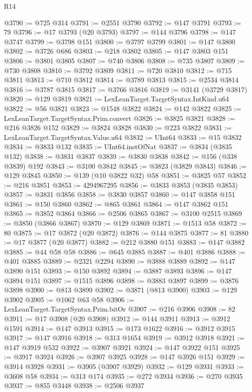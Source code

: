 \begin{lexlean}{R14}
\begin{coremodule}
@3790 := @725 @314
@3791 := @2551 @3790
@3792 := @147 @3791
@3793 := 79
@3796 := @17 @3793 (@20 @3793)
@3797 := @144 @3796
@3798 := @147 @3747
@3799 := @3798 @151
@3800 := @3797 @3799
@3801 := @147 @3800
@3802 := @3726 @686
@3803 := @218 @3802
@3805 := @147 @3803 @151
@3806 := @3801 @3805
@3807 := @740 @3806
@3808 := @735 @3807
@3809 := @730 @3808
@3810 := @3792 @3809
@3811 := @720 @3810
@3812 := @715 @3811
@3813 := @710 @3812
@3814 := @3789 @3813
@3815 := @2534 @3814
@3816 := @3787 @3815
@3817 := @3766 @3816
@3819 := @3141 (@3729 @3817)
@3820 := @129 @3819
@3821 := LexLeanTarget.TargetSyntax.IntKind.u64
@3822 := @56 @3821
@3823 := @1548 @3822
@3824 := @142 @3822
@3825 := LexLeanTarget.TargetSyntax.Prim.convert
@3826 := @3825 @3821
@3828 := @216 @3826 @152
@3829 := @3824 @3828
@3830 := @223 @3822
@3831 := LexLeanTarget.TargetSyntax.Value.u64
@3832 := UInt64
@3833 := @15 @3832
@3834 := @3833 @132
@3835 := UInt64.instOfNat
@3837 := @3834 (@3835 @132)
@3838 := @3831 @3837
@3839 := @3830 @3838
@3842 := @156 (@338 @3839) @192
@3843 := @3100 @3842
@3845 := @3823 (@3829 @3843)
@3846 := @129 @3845
@3850 := @139 (@10 @3822 @32) @58
@3851 := @3825 @57
@3852 := @216 @3851
@3853 := 4294967295
@3856 := @3833 @3853 (@3835 @3853)
@3857 := @3831 @3856
@3858 := @3830 @3857
@3860 := @147 @3858 @151
@3861 := @150 @3860
@3862 := @865 @3861
@3864 := @147 @3862 @151
@3865 := @3852 @3864
@3866 := @2506 @3865
@3867 := @3100 @2515
@3869 := @3850 (@3866 @3867)
@3870 := @129 @3869
@3871 := @1513 @58
@3872 := 80
@3875 := @17 @3872 (@20 @3872)
@3876 := @144 @3875
@3877 := 81
@3880 := @17 @3877 (@20 @3877)
@3882 := @212 @3880 @151
@3883 := @147 @3882
@3885 := @44 @58 @58
@3886 := @645 @3885
@3887 := @401 @3886
@3888 := @401 @3885
@3889 := @2321 @2294
@3890 := @3888 @3889
@3892 := @147 @3890 @151
@3893 := @150 @3892
@3894 := @3887 @3893
@3896 := @147 @3894 @151
@3897 := @1515 @3896
@3898 := @3883 @3897
@3899 := @3876 @3898
@3900 := @813 @3899
@3902 := @3871 (@813 @3900)
@3903 := @129 @3902
@3905 := @1062 @63 @58
@3906 := LexLeanTarget.TargetSyntax.Prim.bitOr
@3907 := @216 @3906
@3908 := 82
@3911 := @17 @3908 (@20 @3908)
@3912 := @144 @3911
@3913 := @3912 @1591
@3914 := @147 @3913
@3915 := @173 @1622
@3916 := @3912 @3915
@3917 := @147 @3916
@3918 := @313 @1654
@3919 := @3912 @3918
@3921 := @147 @3919 @532
@3922 := @3907 @3921
@3924 := @147 @3922 @151
@3925 := @3917 @3924
@3926 := @3907 @3925
@3928 := @147 @3926 @151
@3929 := @3914 @3928
@3931 := @3905 (@3907 @3929)
@3932 := @129 @3931
@3933 := @3608 @58
@3934 := @313 @174
@3935 := @272 @3934
@3936 := @270 @3935
@3937 := @855 @3448
@3938 := @2506 @3937

\end{coremodule}
\end{lexlean}
